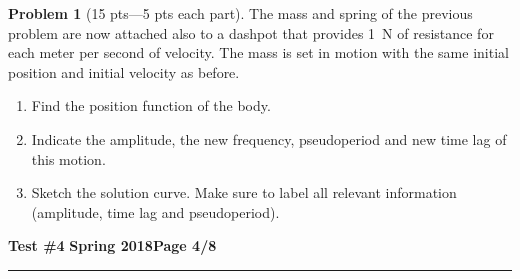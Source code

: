 \documentclass[12pt]{article}
\theoremstyle{definition}
\newtheorem{problem}{Problem}
\begin{document}
\bigskip
\begin{problem}[15 pts---5 pts each part]
The mass and spring of the previous problem are now attached also to a dashpot that provides 1~N of resistance for each meter per second of velocity.  The mass is set in motion with the same initial position and initial velocity as before.
\begin{enumerate}
  \item Find the position function of the body.
  \vspace{4cm}
  \begin{flushright}
  \end{flushright}
  \item Indicate the amplitude, the new frequency, pseudoperiod and new time lag of this motion.
  \vspace{4cm}
  \begin{flushright}
  \end{flushright}
  \item Sketch the solution curve.  Make sure to label all relevant information (amplitude, time lag and pseudoperiod).
\end{enumerate}
\end{problem} 

\newpage

\hfill{\large\bf Test \#4}\hfill{\large\bf
  Spring 2018}\hfill{\large\bf Page 4/8}\hrule
\end{document}

